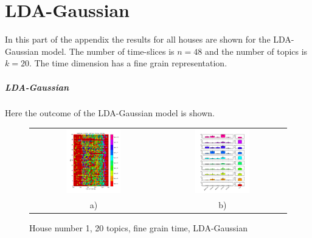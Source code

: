 \chapter{LDA-Gaussian}
\label{A}
In this part of the appendix the results for all houses are shown for the LDA-Gaussian model. The number of time-slices is $n=48$ and the number of topics is $k=20$. The time dimension has a fine grain representation.

\paragraph{LDA-Gaussian}
Here the outcome of the LDA-Gaussian model is shown.

\begin{figure}[h!]
 \centering
 \begin{tabular}{c c}
  \includegraphics[width=0.45\textwidth]{Pictures/Gaus/fine/DayHN1TS48k20fine.png}
  &
  \includegraphics[width=0.45\textwidth]{Pictures/Gaus/fine/TopHN1TS48k20fine.png}\\
  a) & b)
 \end{tabular}
  \caption{House number 1, 20 topics, fine grain time, LDA-Gaussian}
\end{figure}

